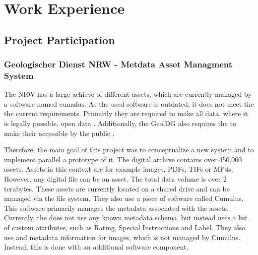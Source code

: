 \documentclass[11pt, titlepage, a4paper]{article}
\begin{document}
\section{Work Experience}
\subsection{Project Participation}
\subsubsection{Geologischer Dienst NRW - Metdata Asset Managment System}
The   NRW has a large achieve of different assets, which are currently managed by a software named cumulus. As the used software is outdated, it does not meet the the current requirements.
Primarily they  are required to make all data, where it is legally possible, open data \cite{GesetzZurForderung2017}.
Additionally, the GeolDG also requires the  to make their accessible by the public \cite{GesetzZurStaatlichen2020}.

Therefore, the main goal of this project was to conceptualize a new system and to implement parallel a prototype of it.
The  digital archive contains over 450,000 assets. Assets in this context are for example images, PDFs, TIFs or MP4s. However, any digital file can be an asset. The total data volume is over 2 terabytes.
These assets are currently located on a shared drive and can be managed via the file system. They also use a piece of software called Cumulus. This software primarily manages the metadata associated with the assets. Currently, the  does not use any known metadata schema, but instead uses a list of custom attributes, such as Rating, Special Instructions and Label.
They also use  and  metadata information for images, which is not managed by Cumulus. Instead, this is done with an additional software component.
\end{document}
